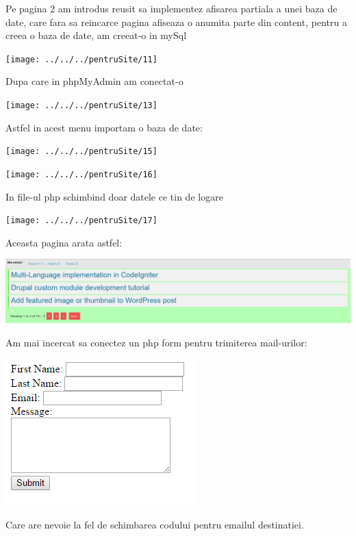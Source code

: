Pe pagina 2 am introdus reusit sa implementez afisarea partiala a unei baza de date, care fara sa reincarce pagina afiseaza o anumita parte din content, pentru a creea o baza de date, am creeat-o in mySql 
\begin{center}
\texttt{[image: ../../../pentruSite/11]}
\end{center}
Dupa care in phpMyAdmin am conectat-o

\begin{center}
\texttt{[image: ../../../pentruSite/13]}
\end{center}
Astfel in acest menu importam o baza de date:
	
\begin{center}
\texttt{[image: ../../../pentruSite/15]}
\end{center}

\begin{center}
\texttt{[image: ../../../pentruSite/16]}
\end{center}
In file-ul php schimbind doar datele ce tin de logare

\begin{center}
\texttt{[image: ../../../pentruSite/17]}
\end{center}
Aceasta pagina arata astfel:
\begin{center}
\includegraphics[width=0.7\linewidth]{13}
\end{center}

Am mai incercat sa conectez un php form pentru trimiterea mail-urilor:
\begin{center}
\includegraphics[width=0.7\linewidth]{14}
\end{center}
Care are nevoie la fel de schimbarea codului pentru emailul destinatiei.

\clearpage